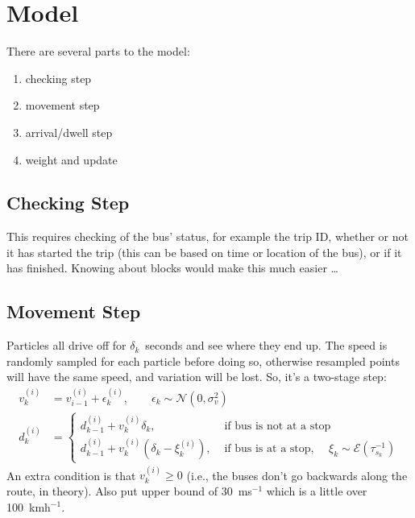 \documentclass[10pt,a4paper]{article}
\begin{document}
\section{Model}

There are several parts to the model:

\begin{enumerate}
\item checking step
\item movement step
\item arrival/dwell step
\item weight and update
\end{enumerate}


\subsection{Checking Step}

This requires checking of the bus' status, for example the trip ID, whether or not it has started the trip
(this can be based on time or location of the bus), or if it has finished.
Knowing about blocks would make this much easier \ldots


\subsection{Movement Step}
\label{sec:move}

Particles all drive off for $\delta_k$~seconds and see where they end up.
The speed is randomly sampled for each particle before doing so, otherwise resampled points will have the same speed,
and variation will be lost.
So, it's a two-stage step:
\begin{align*}
  v_k^{(i)} &= v_{i-1}^{(i)} + \epsilon_{k}^{(i)},\qquad \epsilon_k \sim \mathcal{N}(0, \sigma_v^2) \\
  d_k^{(i)} &=
              \begin{cases}
                d_{k-1}^{(i)} + v_k^{(i)} \delta_k, & \text{ if bus is not at a stop } \\
                d_{k-1}^{(i)} + v_k^{(i)} \left(\delta_k - \xi_k^{(i)}\right),
                &\text{ if bus is at a stop, } \quad \xi_k \sim \mathcal{E}(\tau_{s_k}^{-1})
              \end{cases}
\end{align*}
An extra condition is that $v_k^{(i)} \geq 0$ (i.e., the buses don't go backwards along the route, in theory).
Also put upper bound of 30~ms$^{-1}$ which is a little over 100~kmh$^{-1}$.
\end{document}
